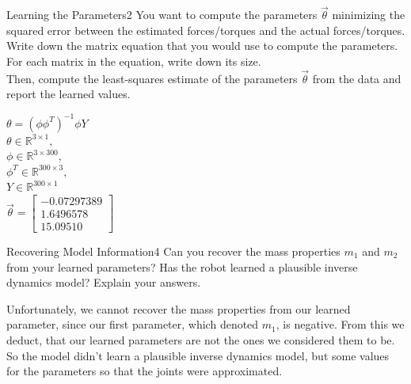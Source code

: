 \begin{questions}


\begin{question}{Learning the Parameters}{2}
You want to compute the parameters $\vec{\theta}$ minimizing the squared error between the estimated forces/torques and the actual forces/torques.
Write down the matrix equation that you would use to compute the parameters. For each matrix in the equation, write down its size.\\
Then, compute the least-squares estimate of the parameters $\vec{\theta}$ from the data and report the learned values.

\begin{answer}

$\theta = (\phi\phi^{T})^{-1}\phi Y$ \\
$\theta \in \mathbb{R}^{3\times1},$\\
$\phi \in \mathbb{R}^{3\times300},$\\
$\phi^T \in \mathbb{R}^{300\times3},$\\
$Y \in \mathbb{R}^{300\times1}$\\
$\vec{\theta}= 
\begin{bmatrix} 
	-0.07297389 \\
	1.6496578 \\
	15.09510
\end{bmatrix}$
\end{answer}

\end{question}



\begin{question}{Recovering Model Information}{4}
	Can you recover the mass properties $m_{1}$ and $m_{2}$ from your learned parameters? Has the robot learned a plausible inverse dynamics model? Explain your answers.
	
\begin{answer}
Unfortunately, we cannot recover the mass properties from our learned parameter, since our first parameter, which denoted $m_1$, is negative. From this we deduct, that our learned parameters are not the ones we considered them to be. So the model didn't learn a plausible inverse dynamics model, but some values for the parameters so that the joints were approximated.
\end{answer}
\end{question}




\end{questions}
